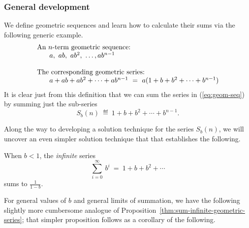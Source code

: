 \subsubsection{General development}
\label{sec:general-geometric}

We define geometric sequences and learn how to calculate their sums
via the following generic example.
\begin{equation}
\label{eq:geom-seq}
\begin{array}{l}
\mbox{An $n$-term geometric sequence:} \\
\hspace*{.25in}a, \ ab, \ ab^2, \ \ldots, ab^{n-1} \\
 \\
\mbox{The corresponding geometric series:} \\
\hspace*{.25in}a + ab + ab^2 + \cdots + ab^{n-1} \ = \
 a (1+ b + b^2 + \cdots + b^{n-1})
\end{array}
\end{equation}
It is clear just from this definition that we can sum the series in
(\ref{eq:geom-seq}) by summing just the sub-series
\begin{equation}
\label{eq:geom-series}
S_{b}(n) \ \eqdef \
1+ b + b^2 + \cdots + b^{n-1}.
\end{equation}

Along the way to developing a solution technique for the series
$S_{b}(n)$, we will uncover an even simpler solution
technique that that establishes the following.

\begin{prop}
\label{thm:sum-infinite-geometric-series}
When $b < 1$,  the {\em infinite} series
\[ \sum_{i=0}^\infty \ b^i \ = \ 1 + b + b^2 + \cdots \]
sums to $\displaystyle \frac{1}{1-b}$.
\end{prop}

\bigskip

For general values of $b$ and general limits of summation, we have the
following slightly more cumbersome analogue of
Proposition~\ref{thm:sum-infinite-geometric-series}; that simpler
proposition follows as a corollary of the following.

